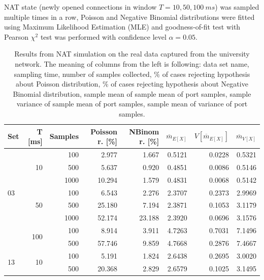 \documentclass{llncs}
\begin{document}
NAT state (newly opened connections in window $T=10, 50, 100~ms$)
was sampled multiple times in a row, Poisson and Negative Binomial distributions were fitted using Maximum Likelihood Estimation (MLE)
and goodness-of-fit test with Pearson $\chi^2$ test was performed with confidence level $\alpha=0.05$.

\begin{table}[t]
  \centering
  \begin{tabular}{| l | r | r | r | r | r | r | r |} %
    \hline
    Set & T [ms] & Samples & Poisson r. [\%] & NBinom r. [\%] & $\overline{m}_{E[X]}$ &  $V[\overline{m}_{E[X]}]$  & $\overline{m}_{V[X]}$ \\ \hline \hline 
    \multirow{7}{*}{03} & \multirow{3}{*}{10}   & 100		& 2.977		& 1.667		& 0.5121        & 0.0228                    & 0.5321 \\ \cline{3-8}
      &      & 500      	& 5.637		& 0.920		& 0.4851        & 0.0086        & 0.5146 \\  \cline{3-8}
      &      & 1000     	& 10.294	& 1.579		& 0.4831        & 0.0068        & 0.5142 \\  \cline{2-8}
      & \multirow{3}{*}{50}     & 100     	& 6.543		& 2.276 	& 2.3707	& 0.2373 & 2.9969 \\ \cline{3-8}
      &      & 500     		& 25.180	& 7.194		& 2.3871        & 0.1053        & 3.1179 \\ \cline{3-8}
      &      & 1000    		& 52.174	& 23.188	& 2.3920        & 0.0696        & 3.1576 \\ \cline{2-8}
      & \multirow{2}{*}{100}  	& 100		& 8.914		& 3.911		& 4.7263        & 0.7031                    & 7.1496 \\ \cline{3-8}
      &      & 500     		& 57.746	& 9.859		& 4.7668	& 0.2876 	& 7.4667 					\\ \hline

    \multirow{2}{*}{13}  & \multirow{2}{*}{10}     & 100     & 5.191      & 1.824     & 2.6438       &  0.2695    & 3.0020 \\ \cline{3-8}
      &      & 500     & 20.368     & 2.829     & 2.6579       &  0.1025                    & 3.1495 \\ \hline
  \end{tabular}
  \caption{Results from NAT simulation on the real data captured from the university network. 
    The meaning of columns from the left is following: data set name, sampling time, number of samples collected,
    \% of cases rejecting hypothesis about Poisson distribution,  
    \% of cases rejecting hypothesis about Negative Binomial distribution,
    sample mean of sample mean of port samples,
    sample variance of sample mean of port samples,
    sample mean of variance of port samples.}
  \label{tab:1}
\end{table}
\end{document}
